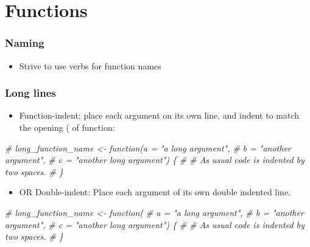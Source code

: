 \documentclass[
]{article}
\newenvironment{Shaded}{\begin{snugshade}}{\end{snugshade}}
\newcommand{\CommentTok}[1]{\textcolor[rgb]{0.56,0.35,0.01}{\textit{#1}}}
\providecommand{\tightlist}{%
  \setlength{\itemsep}{0pt}\setlength{\parskip}{0pt}}
\begin{document}
\hypertarget{functions}{%
\section{Functions}\label{functions}}

\hypertarget{naming}{%
\subsubsection{Naming}\label{naming}}

\begin{itemize}
\tightlist
\item
  Strive to use verbs for function names
\end{itemize}

\hypertarget{long-lines-1}{%
\subsubsection{Long lines}\label{long-lines-1}}

\begin{itemize}
\tightlist
\item
  Function-indent: place each argument on its own line, and indent to
  match the opening ( of function:
\end{itemize}

\begin{Shaded}
\begin{Highlighting}[]
\CommentTok{# long_function_name <- function(a = "a long argument",}
\CommentTok{#                                b = "another argument",}
\CommentTok{#                                c = "another long argument") \{}
\CommentTok{#   # As usual code is indented by two spaces.}
\CommentTok{# \}}
\end{Highlighting}
\end{Shaded}

\begin{itemize}
\tightlist
\item
  OR Double-indent: Place each argument of its own double indented line.
\end{itemize}

\begin{Shaded}
\begin{Highlighting}[]
\CommentTok{# long_function_name <- function(}
\CommentTok{#     a = "a long argument",}
\CommentTok{#     b = "another argument",}
\CommentTok{#     c = "another long argument") \{}
\CommentTok{#   # As usual code is indented by two spaces.}
\CommentTok{# \}}
\end{Highlighting}
\end{Shaded}
\end{document}
